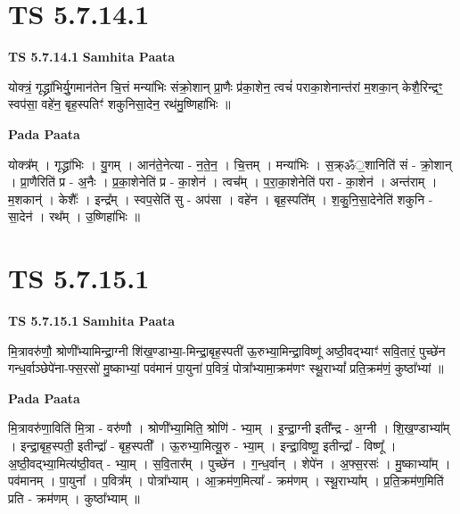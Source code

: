 \documentclass[17pt]{extarticle}
\begin{document}
\section{ TS 5.7.14.1 }

\textbf{TS 5.7.14.1 } \newline
\textbf{Samhita Paata} \newline

योक्त्रं॒ गृद्ध्रा॑भिर्यु॒गमान॑तेन चि॒त्तं मन्या॑भिः संक्रो॒शान् प्रा॒णैः प्र॑का॒शेन॒ त्वचं॑ पराका॒शेनान्त॑रां म॒शका॒न् केशै॒रिन्द्रꣳ॒॒ स्वप॑सा॒ वहे॑न॒ बृह॒स्पतिꣳ॑ शकुनिसा॒देन॒ रथ॑मु॒ष्णिहा॑भिः ॥ \newline

\textbf{Pada Paata} \newline

योक्त्र᳚म् । गृद्ध्रा॑भिः । यु॒गम् । आन॑ते॒नेत्या - न॒ते॒न॒ । चि॒त्तम् । मन्या॑भिः । स॒क्र्ॐ॒शानिति॑ सं - क्रो॒शान् । प्रा॒णैरिति॑ प्र - अ॒नैः । प्र॒का॒शेनेति॑ प्र - का॒शेन॑ । त्वच᳚म् । प॒रा॒का॒शेनेति॑ परा - का॒शेन॑ । अन्त॑राम् । म॒शकान्॑ । केशैः᳚ । इन्द्र᳚म् । स्वप॒सेति॑ सु - अप॑सा । वहे॑न । बृह॒स्पति᳚म् । श॒कु॒नि॒सा॒देनेति॑ शकुनि - सा॒देन॑ । रथ᳚म् । उ॒ष्णिहा॑भिः ॥  \newline





\section{ TS 5.7.15.1 }

\textbf{TS 5.7.15.1 } \newline
\textbf{Samhita Paata} \newline

मि॒त्रावरु॑णौ॒ श्रोणी᳚भ्यामिन्द्रा॒ग्नी शि॑ख॒ण्डाभ्या॒-मिन्द्रा॒बृह॒स्पती॑ ऊ॒रुभ्या॒मिन्द्रा॒विष्णू॑ अष्ठी॒वद्भ्याꣳ॑ सवि॒तारं॒ पुच्छे॑न गन्ध॒र्वाञ्छेपे॑ना-फ्स॒रसो॑ मु॒ष्काभ्यां॒ पव॑मानं पा॒युना॑ प॒वित्रं॒ पोत्रा᳚भ्यामा॒क्रम॑णꣳ स्थू॒राभ्यां᳚ प्रति॒क्रम॑णं॒ कुष्ठा᳚भ्यां ॥ \newline

\textbf{Pada Paata} \newline

मि॒त्रावरु॑णा॒विति॑ मि॒त्रा - वरु॑णौ । श्रोणी᳚भ्या॒मिति॒ श्रोणि॑ - भ्या॒म् । इ॒न्द्रा॒ग्नी इती᳚न्द्र - अ॒ग्नी । शि॒ख॒ण्डाभ्या᳚म् । इन्द्रा॒बृह॒स्पती॒ इतीन्द्रा᳚ - बृह॒स्पती᳚ । ऊ॒रुभ्या॒मित्यू॒रु - भ्या॒म् । इन्द्रा॒विष्णू॒ इतीन्द्रा᳚ - विष्णू᳚ । अ॒ष्ठी॒वद्भ्या॒मित्य॑ष्ठी॒वत् - भ्या॒म् । स॒वि॒तार᳚म् । पुच्छे॑न । ग॒न्ध॒र्वान् । शेपे॑न । अ॒फ्स॒रसः॑ । मु॒ष्काभ्या᳚म् । पव॑मानम् । पा॒युना᳚ । प॒वित्र᳚म् । पोत्रा᳚भ्याम् । आ॒क्रम॑ण॒मित्या᳚ - क्रम॑णम् । स्थू॒राभ्या᳚म् । प्र॒ति॒क्रम॑ण॒मिति॑ प्रति - क्रम॑णम् । कुष्ठा᳚भ्याम् ॥  \newline
\end{document}
